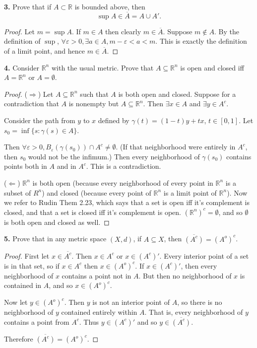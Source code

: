 \documentclass{article}
\newcommand{\R}{\mathbb{R}}
\begin{document}
\newpage %

\textbf{3. } %
Prove that if $A \subset \R$ is bounded above, then
$$\sup A \in \overline{A} = A \cup A'.$$
\begin{proof}
    Let $m = \sup A$. If $m \in A$ then clearly $m \in \overline{A}$. Suppose $m \notin A$. By the definition of $\sup$, $\forall \varepsilon > 0, \exists a \in A, m - \varepsilon < a < m$. This is exactly the definition of a limit point, and hence $m \in \overline{A}$.    
\end{proof}

\newpage %

\textbf{4. } Consider $\R^n$ with the usual metric. Prove that $A \subseteq \R^n$ is open and closed iff $A = \R^n$ or $A = \emptyset$.

\begin{proof}
    ($\Longrightarrow$) Let $A \subseteq \R^n$ such that $A$ is both open and closed. Suppose for a contradiction that $A$ is nonempty but $A \subseteq \R^n$. Then $\exists x \in A$ and $\exists y \in A^c$. 

    Consider the path from $y$ to $x$ defined by $\gamma(t) = (1 - t)y + tx$, $t \in [0, 1]$. Let $s_0 = \inf\{s : \gamma(s) \in A\}$. 
    
    Then $\forall \varepsilon > 0, B_\varepsilon(\gamma(s_0)) \cap A^c \ne \emptyset$. (If that neighborhood were entirely in $A^c$, then $s_0$ would not be the infimum.) Then every neighborhood of $\gamma(s_0)$ contains points both in $A$ and in $A^c$. This is a contradiction.


    ($\Longleftarrow$) %
    $\R^n$ is both open (because every neighborhood of every point in $\R^n$ is a subset of $R^n$) and closed (because every point of $\R^n$ is a limit point of $\R^n$). Now we refer to Rudin Them 2.23, which says that a set is open iff it's complement is closed, and that a set is closed iff it's complement is open. $(\R^n)^c = \emptyset$, and so $\emptyset$ is both open and closed as well.
\end{proof}

\newpage %

\textbf{5. } %
Prove that in any metric space $(X, d)$, if $A \subseteq X$, then $\overline{(A^c)} = (A^o)^c$.

\begin{proof}
    First let $x \in \overline{A^c}$. Then $x \in A^c$ or $x \in (A^c)'$. Every interior point of a set is in that set, so if $x \in A^c$ then $x \in (A^o)^c$. If $x \in (A^c)'$, then every neighborhood of $x$ contains a point not in $A$. But then no neighborhood of $x$ is contained in $A$, and so $x \in (A^o)^c$.

    Now let $y \in (A^o)^c$. Then $y$ is not an interior point of $A$, so there is no neighborhood of $y$ contained entirely within $A$. That is, every neighborhood of $y$ contains a point from $A^c$. Thus $y \in (A^c)'$ and so $y \in \overline{(A^c)}$.

    Therefore $\overline{(A^c)} = (A^o)^c$.
    
\end{proof}
\end{document}
